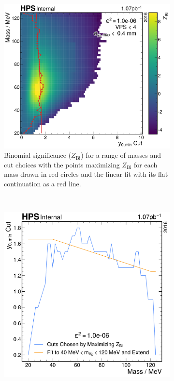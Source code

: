 \begin{figure}
  \centering
  \begin{subfigure}{0.48\textwidth}
    \includegraphics[width=\textwidth]{figures/hps/analysis/miny0-after-others-zbi-eps2-1e-6.pdf}
    \caption{%
      Binomial significance ($Z_\mathrm{Bi}$) for a range of masses and \minyzero cut choices
      with the points maximizing $Z_\mathrm{Bi}$ for each mass drawn in red circles and the linear fit with
      its flat continuation as a red line.
    }
    \label{fig:miny0-opt:zbi}
  \end{subfigure}
  ~
  \begin{subfigure}{0.48\textwidth}
    \includegraphics[width=\textwidth]{figures/hps/analysis/miny0-cut-after-others-fit-eps2-1e-6.pdf}

\end{subfigure}
\end{figure}
